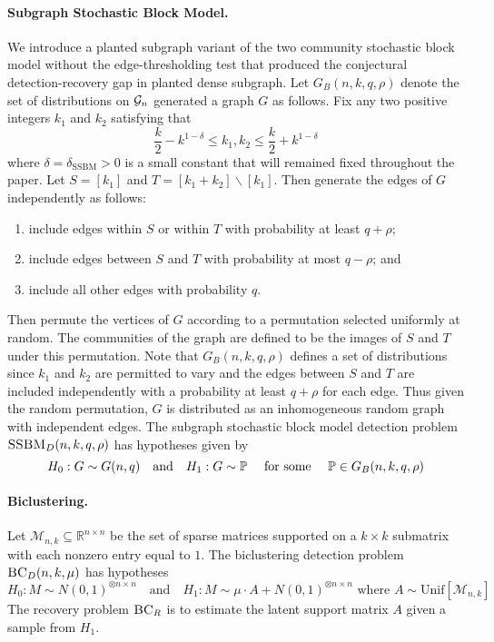 \paragraph{Subgraph Stochastic Block Model.} We introduce a planted subgraph variant of the two community stochastic block model without the edge-thresholding test that produced the conjectural detection-recovery gap in planted dense subgraph. Let $G_B(n, k, q, \rho)$ denote the set of distributions on $\mathcal{G}_n$ generated a graph $G$ as follows. Fix any two positive integers $k_1$ and $k_2$ satisfying that
$$\frac{k}{2} - k^{1-\delta} \le k_1, k_2 \le \frac{k}{2} + k^{1 - \delta}$$
where $\delta = \delta_{\text{SSBM}} > 0$ is a small constant that will remained fixed throughout the paper. Let $S = [k_1]$ and $T = [k_1+k_2]\backslash [k_1]$. Then generate the edges of $G$ independently as follows:
\begin{enumerate}
\item include edges within $S$ or within $T$ with probability at least $q + \rho$;
\item include edges between $S$ and $T$ with probability at most $q - \rho$; and
\item include all other edges with probability $q$.
\end{enumerate}
Then permute the vertices of $G$ according to a permutation selected uniformly at random. The communities of the graph are defined to be the images of $S$ and $T$ under this permutation. Note that $G_B(n, k, q, \rho)$ defines a set of distributions since $k_1$ and $k_2$ are permitted to vary and the edges between $S$ and $T$ are included independently with a probability at least $q + \rho$ for each edge. Thus given the random permutation, $G$ is distributed as an inhomogeneous random graph with independent edges. The subgraph stochastic block model detection problem $\textsc{SSBM}_D(n, k, q, \rho)$ has hypotheses given by
$$H_0: G \sim G(n, q) \quad \text{and} \quad H_1 : G \sim \mathbb{P} \quad \text{ for some } \quad \mathbb{P} \in G_B(n, k, q, \rho)$$

\paragraph{Biclustering.} Let $\mathcal{M}_{n, k} \subseteq \mathbb{R}^{n \times n}$ be the set of sparse matrices supported on a $k \times k$ submatrix with each nonzero entry equal to $1$. The biclustering detection problem $\textsc{BC}_D(n, k, \mu)$ has hypotheses
$$H_0: M \sim N(0, 1)^{\otimes n \times n} \quad \text{and} \quad H_1 : M \sim \mu \cdot A + N(0, 1)^{\otimes n \times n} \text{ where } A \sim \text{Unif}\left[\mathcal{M}_{n,k}\right]$$
The recovery problem $\textsc{BC}_R$ is to estimate the latent support matrix $A$ given a sample from $H_1$.

